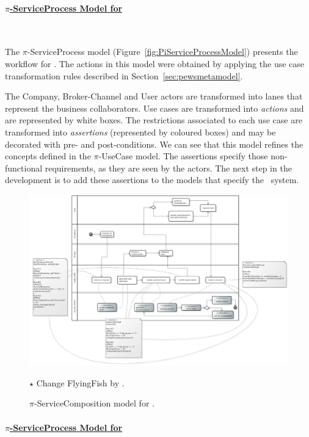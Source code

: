 \paragraph{\underline{$\pi$-ServiceProcess Model for \FlyingPig}}~

The $\pi$-ServiceProcess model (Figure~\ref{fig:PiServiceProcessModel}) presents the workflow for \FlyingPig.
The actions in this model were obtained by applying the use case transformation rules described in Section~\ref{sec:pewsmetamodel}.

The \textsf{Company}, \textsf{Broker-Channel} and \textsf{User} actors are transformed into lanes that represent the business collaborators.
Use cases are transformed into \textit{actions} and are represented by white boxes.
The restrictions associated to each use case are transformed into \textit{assertions} (represented by coloured boxes) and may be decorated with pre- and post-conditions. 
We can see that this model refines the concepts defined in the $\pi$-UseCase model.
The assertions specify those non-functional requirements, as they are seen by the actors. 
The next step in the development is to add these assertions to the models that specify the \FlyingPig\ system.

\begin{figure}[t]
\centering
\includegraphics[width=1.0\textwidth]{figs/ServiceCompositionGeneralCut.png}
{\color{red} \raggedright
$\star$ Change FlyingFish by \FlyingPig.
}
\caption{$\pi$-ServiceComposition model for \FlyingPig.\label{fig:PiServiceCompositionModel}}
\end{figure}

\paragraph{\underline{$\pi$-ServiceProcess Model for \FlyingPig}}~

